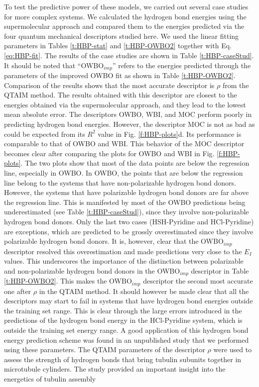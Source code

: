 \documentclass[11pt]{report}
\begin{document}
To test the predictive power of these models, we carried
out several case studies for more complex systems. We calculated the hydrogen bond energies using the supermolecular approach and compared them to the energies predicted via the four quantum mechanical descriptors studied here. We used the linear fitting parameters in Tables 
\ref{t:HBP-stat} and \ref{t:HBP-OWBO2} 
together with 
Eq. \ref{eq:HBP-fit}. The results of the case studies are shown in 
Table \ref{t:HBP-caseStud}. 
It should be noted that ``OWBO$_{imp}$'' refers to the energies predicted through the parameters of the improved
OWBO fit as shown in Table 
\ref{t:HBP-OWBO2}. 
Comparison of the results shows that the most accurate descriptor is $\rho$ from the QTAIM method. The results obtained with this descriptor are closest to the energies obtained via the supermolecular approach, and they lead to the lowest mean absolute error. The descriptors OWBO, WBI, and MOC perform poorly in predicting hydrogen bond energies. However, the descriptor MOC is not as bad as could be expected from its $R^2$ value in 
Fig. \ref{f:HBP-plots}d. 
Its performance is comparable to that of OWBO and WBI. This behavior of the MOC descriptor becomes clear after comparing the plots for OWBO and WBI in 
Fig. \ref{f:HBP-plots}. 
The two plots show that most of the data points are below the regression line, especially in OWBO. In OWBO, the points that are below the regression line belong to the systems that have non-polarizable hydrogen bond donors. However, the systems that have polarizable hydrogen bond donors are far above the regression line. This is manifested by most of the OWBO predictions being underestimated (see Table \ref{t:HBP-caseStud}), 
since they involve non-polarizable hydrogen bond donors.
Only the last two cases (HSH-Pyridine and HCl-Pyridine) are exceptions, which are predicted to be grossly overestimated since they involve polarizable hydrogen bond donors. It is, however, clear that the OWBO$_{imp}$ descriptor resolved this overestimation and made predictions very close to the $E_I$ values. This underscores the importance of the distinction between polarizable and non-polarizable hydrogen bond donors in the OWBO$_{imp}$ descriptor in Table
\ref{t:HBP-OWBO2}. 
This makes the OWBO$_{imp}$ descriptor the second most accurate one after $\rho$ in the QTAIM method. It should however be made clear that all the descriptors may start to fail in systems that have hydrogen bond energies outside the training set range. This is clear through the large errors introduced in the predictions of the hydrogen bond energy in the HCl-Pyridine system, which is outside the training set energy range. A good application of this hydrogen bond energy prediction scheme was found in an unpublished study that we performed using these parameters. The QTAIM parameters of the descriptor $\rho$ were used to assess the strength of hydrogen bonds that bring tubulin subunits together in microtubule cylinders. The study provided an important insight into the energetics of tubulin assembly
\end{document}
